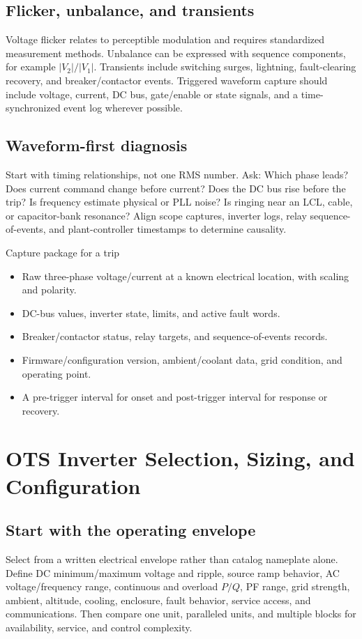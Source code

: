 \documentclass[11pt]{article}
\begin{document}
\subsection{Flicker, unbalance, and transients}
Voltage flicker relates to perceptible modulation and requires standardized
measurement methods. Unbalance can be expressed with sequence components, for
example $|V_2|/|V_1|$. Transients include switching surges, lightning,
fault-clearing recovery, and breaker/contactor events. Triggered waveform
capture should include voltage, current, DC bus, gate/enable or state signals,
and a time-synchronized event log wherever possible.

\subsection{Waveform-first diagnosis}
Start with timing relationships, not one RMS number. Ask: Which phase leads?
Does current command change before current? Does the DC bus rise before the
trip? Is frequency estimate physical or PLL noise? Is ringing near an LCL,
cable, or capacitor-bank resonance? Align scope captures, inverter logs, relay
sequence-of-events, and plant-controller timestamps to determine causality.

\begin{checklistbox}{Capture package for a trip}
\begin{itemize}
\item Raw three-phase voltage/current at a known electrical location, with scaling and polarity.
\item DC-bus values, inverter state, limits, and active fault words.
\item Breaker/contactor status, relay targets, and sequence-of-events records.
\item Firmware/configuration version, ambient/coolant data, grid condition, and operating point.
\item A pre-trigger interval for onset and post-trigger interval for response or recovery.
\end{itemize}
\end{checklistbox}

\section{OTS Inverter Selection, Sizing, and Configuration}

\subsection{Start with the operating envelope}
Select from a written electrical envelope rather than catalog nameplate alone.
Define DC minimum/maximum voltage and ripple, source ramp behavior, AC
voltage/frequency range, continuous and overload $P/Q$, PF range, grid strength,
ambient, altitude, cooling, enclosure, fault behavior, service access, and
communications. Then compare one unit, paralleled units, and multiple blocks
for availability, service, and control complexity.
\end{document}

